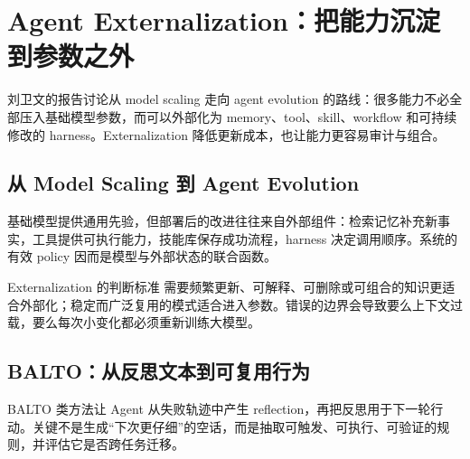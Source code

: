 \section{Agent Externalization：把能力沉淀到参数之外}

刘卫文的报告讨论从 model scaling 走向 agent evolution 的路线：很多能力不必全部压入基础模型参数，而可以外部化为 memory、tool、skill、workflow 和可持续修改的 harness。Externalization 降低更新成本，也让能力更容易审计与组合。



\subsection{从 Model Scaling 到 Agent Evolution}

基础模型提供通用先验，但部署后的改进往往来自外部组件：检索记忆补充新事实，工具提供可执行能力，技能库保存成功流程，harness 决定调用顺序。系统的有效 policy 因而是模型与外部状态的联合函数。



\begin{importantbox}{Externalization 的判断标准}
需要频繁更新、可解释、可删除或可组合的知识更适合外部化；稳定而广泛复用的模式适合进入参数。错误的边界会导致要么上下文过载，要么每次小变化都必须重新训练大模型。
\end{importantbox}

\subsection{BALTO：从反思文本到可复用行为}

BALTO 类方法让 Agent 从失败轨迹中产生 reflection，再把反思用于下一轮行动。关键不是生成“下次更仔细”的空话，而是抽取可触发、可执行、可验证的规则，并评估它是否跨任务迁移。


